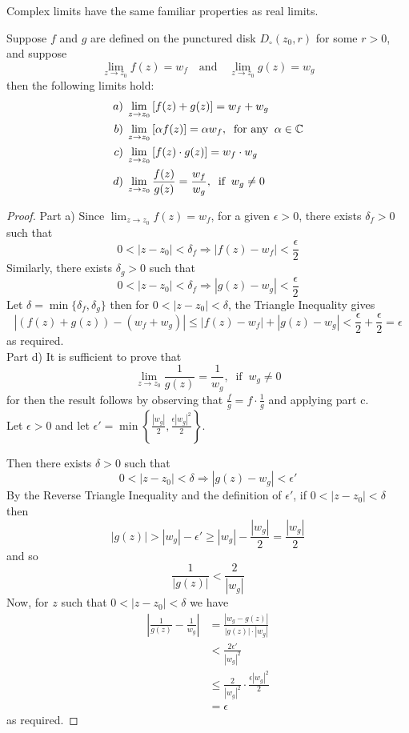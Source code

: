 \documentclass[handout]{ximera}
\begin{document}
Complex limits have the same familiar properties as real limits.

\begin{theorem}
Suppose $f$ and $g$ are defined on the punctured disk $D_\circ(z_0, r)$ for some $r>0$, and suppose
\[
\lim_{z \to z_0} f(z) = w_f \quad \mbox{and} \quad \lim_{z \to z_0} g(z) = w_g
\]
then the following limits hold:
\begin{align*}
a) \; & \lim_{z \to z_0} \left[f(z)+ g(z)\right] = w_f +w_g\\
b) \; & \lim_{z \to z_0} \left[\alpha f(z)\right] = \alpha w_f, \;\; \mbox{for any} \;\;\alpha \in \mathbb C\\
c) \; & \lim_{z \to z_0} \left[f(z)\cdot g(z)\right] = w_f \cdot w_g\\
d) \; & \lim_{z \to z_0} \frac{f(z)}{g(z)} = \frac{w_f}{w_g}, \;\; \mbox{if}\;\; w_g \neq 0
\end{align*}
\end{theorem}

\begin{proof}
Part a)  Since $\lim_{z \to z_0} f(z) = w_f$, for a given $\epsilon >0$, there exists $\delta_f >0$ such that
\[
0<|z-z_0| < \delta_f \Rightarrow |f(z) - w_f| < \frac{\epsilon}{2}
\]
Similarly, there exists $\delta_g >0$ such that
\[
0<|z-z_0| < \delta_f \Rightarrow |g(z) - w_g| < \frac{\epsilon}{2}
\]
Let $\delta = \min\{\delta_f, \delta_g \}$ then for $0< |z-z_0| < \delta$, the Triangle Inequality gives
\[
|\left(f(z) + g(z)\right) - (w_f + w_g)| \leq |f(z) - w_f|+|g(z) - w_g| < \frac{\epsilon}{2}+\frac{\epsilon}{2} = \epsilon
\]
as required.\\[6pt]

Part d) It is sufficient to prove that 
\[
\lim_{z \to z_0} \frac{1}{g(z)} = \frac{1}{w_g}, \;\; \mbox{if}\;\; w_g \neq 0
\]
for then the result follows by observing that $\displaystyle \frac{f}{g} = f \cdot \frac{1}{g}$ and applying part c.\\
Let $\epsilon > 0$ and let $\epsilon' = \min\left\{\frac{|w_g|}{2}, \frac{\epsilon |w_g|^2}{2}\right\}$.

Then there exists $\delta >0$ such that
\[
 0< |z-z_0| < \delta \Rightarrow |g(z) - w_g| < \epsilon'
 \]
By the Reverse Triangle Inequality and the definition of $\epsilon'$, if $0 < |z-z_0| < \delta $ then
\[
|g(z)| > |w_g| - \epsilon' \geq |w_g| - \frac{|w_g|}{2} = \frac{|w_g|}{2}
\]
and so 
\[
\frac{1}{|g(z)|} < \frac{2}{|w_g|}
\]
Now, for $z$ such that $0 < |z-z_0| < \delta $ we have 
\begin{align*}
\left| \frac{1}{g(z)} - \frac{1}{w_g} \right| & = \frac{|w_g - g(z)|}{|g(z)|\cdot |w_g|}\\
& < \frac{2\epsilon'}{|w_g|^2}\\
& \leq \frac{2}{|w_g|^2} \cdot \frac{\epsilon |w_g|^2}{2}\\
& = \epsilon
\end{align*}
as required.

\end{proof}
\end{document}
